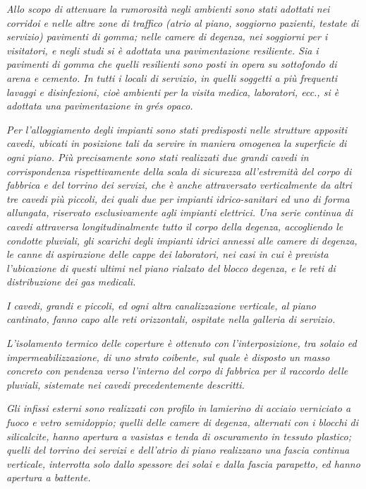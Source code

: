 \sdots

\emph{Allo scopo di attenuare la rumorosità negli ambienti sono stati adottati nei corridoi e nelle altre zone di traffico (atrio al piano, soggiorno pazienti, testate di servizio) pavimenti di gomma; nelle camere di degenza, nei soggiorni per i visitatori, e negli studi si è adottata una pavimentazione resiliente. Sia i pavimenti di gomma che quelli resilienti sono posti in opera su sottofondo di arena e cemento. In tutti i locali di servizio, in quelli soggetti a più frequenti lavaggi e disinfezioni, cioè ambienti per la visita medica, laboratori, ecc., si è adottata una pavimentazione in grés opaco.}

\sdots

\emph{Per l'alloggiamento degli impianti sono stati predisposti nelle strutture appositi cavedi, ubicati in posizione tali da servire in maniera omogenea la superficie di ogni piano. Più precisamente sono stati realizzati due grandi cavedi in corrispondenza rispettivamente della scala di sicurezza all'estremità del corpo di fabbrica e del torrino dei servizi, che è anche attraversato verticalmente da altri tre cavedi più piccoli, dei quali due per impianti idrico-sanitari ed uno di forma allungata, riservato esclusivamente agli impianti elettrici. Una serie continua di cavedi attraversa longitudinalmente tutto il corpo della degenza, accogliendo le condotte pluviali, gli scarichi degli impianti idrici annessi alle camere di degenza, le canne di aspirazione delle cappe dei laboratori, nei casi in cui è prevista l'ubicazione di questi ultimi nel piano rialzato del blocco degenza, e le reti di distribuzione dei gas medicali.}

\sdots

\emph{I cavedi, grandi e piccoli, ed ogni altra canalizzazione verticale, al piano cantinato, fanno capo alle reti orizzontali, ospitate nella galleria di servizio.}

\emph{L'isolamento termico delle coperture è ottenuto con l'interposizione, tra solaio ed impermeabilizzazione, di uno strato coibente, sul quale è disposto un masso concreto con pendenza verso l'interno del corpo di fabbrica per il raccordo delle pluviali, sistemate nei cavedi precedentemente descritti.}

\sdots

\emph{Gli infissi esterni sono realizzati con profilo in lamierino di acciaio verniciato a fuoco e vetro semidoppio; quelli delle camere di degenza, alternati con i blocchi di silicalcite, hanno apertura a vasistas e tenda di oscuramento in tessuto plastico; quelli del torrino dei servizi e dell'atrio di piano realizzano una fascia continua verticale, interrotta solo dallo spessore dei solai e dalla fascia parapetto, ed hanno apertura a battente.}

